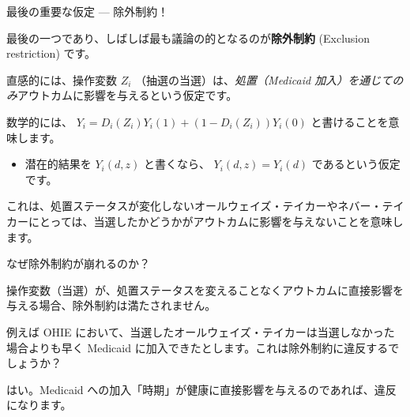 \documentclass[11pt,handout]{beamer}
\newenvironment{wideitemize}{\itemize\addtolength{\itemsep}{10pt}}{\enditemize}
\begin{document}
\begin{frame}{最後の重要な仮定 --- 除外制約！}
	
	\begin{wideitemize}
		\item
		最後の一つであり、しばしば最も議論の的となるのが\textbf{除外制約} (Exclusion restriction) です。
		
		\pause
		\item
		直感的には、操作変数 $Z_i$ （抽選の当選）は、\textit{処置（Medicaid 加入）を通じてのみ}アウトカムに影響を与えるという仮定です。
		
		\pause
		\item
		数学的には、 $Y_i = D_i(Z_i) Y_i(1)  + (1- D_i(Z_i)) Y_i(0) $ と書けることを意味します。
		\medskip
			\begin{itemize}
				\item 
				潜在的結果を $Y_i(d,z)$ と書くなら、 $Y_i(d,z) = Y_i(d)$ であるという仮定です。
			\end{itemize}
		
		\pause
		\item
		これは、処置ステータスが変化しないオールウェイズ・テイカーやネバー・テイカーにとっては、当選したかどうかがアウトカムに影響を与えないことを意味します。
	\end{wideitemize}
	
	
\end{frame}


\begin{frame}{なぜ除外制約が崩れるのか？}
	
\begin{wideitemize}
	\item
	操作変数（当選）が、処置ステータスを変えることなくアウトカムに直接影響を与える場合、除外制約は満たされません。
	
	\pause
	\item
	例えば OHIE において、当選したオールウェイズ・テイカーは当選しなかった場合よりも早く Medicaid に加入できたとします。これは除外制約に違反するでしょうか？
	
	\pause
	\item
	はい。Medicaid への加入「時期」が健康に直接影響を与えるのであれば、違反になります。
	 
\end{wideitemize}	
\end{frame}
\end{document}
